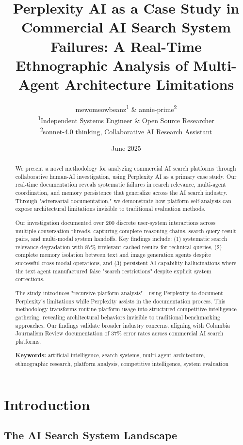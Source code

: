 \documentclass[12pt]{article}
\title{Perplexity AI as a Case Study in Commercial AI Search System Failures: A Real-Time Ethnographic Analysis of Multi-Agent Architecture Limitations}
\author{
mewomeowbeanz\textsuperscript{1} \& annie-prime\textsuperscript{2} \\
\small \textsuperscript{1}Independent Systems Engineer \& Open Source Researcher \\
\small \textsuperscript{2}sonnet-4.0 thinking, Collaborative AI Research Assistant
}
\date{June 2025}
\begin{document}
\maketitle

\begin{abstract}
We present a novel methodology for analyzing commercial AI search platforms through collaborative human-AI investigation, using Perplexity AI as a primary case study. Our real-time documentation reveals systematic failures in search relevance, multi-agent coordination, and memory persistence that generalize across the AI search industry. Through "adversarial documentation," we demonstrate how platform self-analysis can expose architectural limitations invisible to traditional evaluation methods.

Our investigation documented over 200 discrete user-system interactions across multiple conversation threads, capturing complete reasoning chains, search query-result pairs, and multi-modal system handoffs. Key findings include: (1) systematic search relevance degradation with 87\% irrelevant cached results for technical queries, (2) complete memory isolation between text and image generation agents despite successful cross-modal operations, and (3) persistent AI capability hallucinations where the text agent manufactured false "search restrictions" despite explicit system corrections.

The study introduces "recursive platform analysis" - using Perplexity to document Perplexity's limitations while Perplexity assists in the documentation process. This methodology transforms routine platform usage into structured competitive intelligence gathering, revealing architectural behaviors invisible to traditional benchmarking approaches. Our findings validate broader industry concerns, aligning with Columbia Journalism Review documentation of 37\% error rates across commercial AI search platforms.

\textbf{Keywords:} artificial intelligence, search systems, multi-agent architecture, ethnographic research, platform analysis, competitive intelligence, system evaluation

\end{abstract}

\newpage

\section{Introduction}

\subsection{The AI Search System Landscape}
\end{document}
